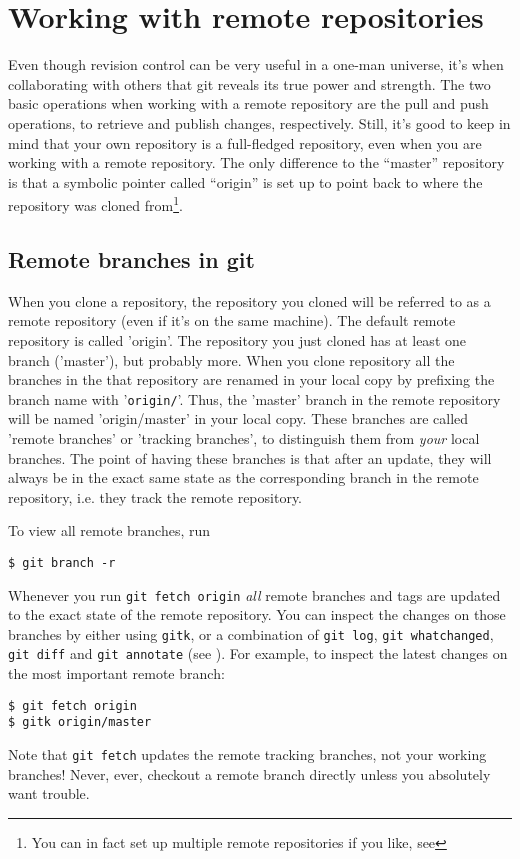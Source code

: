 \documentclass[a4paper,10pt]{article}
\begin{document}
\section{Working with remote repositories}
Even though revision control can be very useful in a one-man universe, it's
when collaborating with others that git reveals its true power and strength.
The two basic operations when working with a remote repository are the pull
and push operations, to retrieve and publish changes, respectively. Still, it's
good to keep in mind that your own repository is a full-fledged repository,
even when you are working with a remote repository. The only difference to
the ``master'' repository is that a symbolic pointer called ``origin'' is set
up to point back to where the repository was cloned from\footnote{You can in
fact set up multiple remote repositories if you like, see }.

\subsection{Remote branches in git}
\label{sec:branch}
When you clone a repository, the repository you cloned will be referred to as
a remote repository (even if it's on the same machine). The default remote
repository is called 'origin'. The repository you just cloned has at least one
branch ('master'), but probably more.
When you clone repository all the branches in the that repository are renamed 
in your local copy by prefixing the branch name with '\texttt{origin/}'. Thus,
the 'master' branch in the remote repository will be named 'origin/master' in
your local copy.
These branches are called 'remote
branches' or 'tracking branches', to distinguish them from \emph{your} local
branches. The point of having these branches is that after an update, 
they will always be in the exact same state as the corresponding branch in the 
remote repository, i.e. they track the remote repository.

To view all remote branches, run
\begin{verbatim}
$ git branch -r
\end{verbatim}
Whenever you run
\texttt{git fetch origin} \emph{all} remote branches and tags 
are updated to the exact
state of the remote repository. You can inspect the changes on those
branches by either using \texttt{gitk}, or a combination of \texttt{git log},
\texttt{git whatchanged}, \texttt{git diff} and \texttt{git annotate} (see
).
For example, to inspect the latest changes on the most important remote branch:
\begin{verbatim}
$ git fetch origin
$ gitk origin/master
\end{verbatim}
Note that \texttt{git fetch} updates the remote
tracking branches, not your working branches!  Never, ever, checkout a remote
branch directly unless you absolutely want trouble. 
\end{document}

